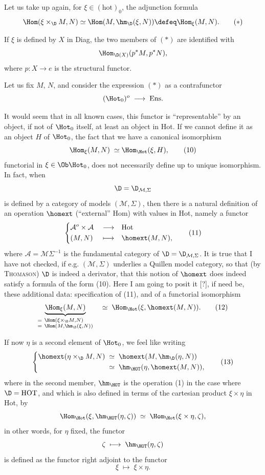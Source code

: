Let us take up again, for $\xi\in(\mathrm{hot})_0$, the adjunction formula
\[
\Hom(\xi\times_{\D}M,N)\simeq\Hom(M,\hm_{\D}(\xi,N))\defeq\Hom_{\xi}(M,N).
\tag*{$(*)$}
\]

If $\xi$ is defined by $X$ in Diag, the two members of $(*)$ are identified with
\[
\Hom_{\D(X)}(p^*M,p^*N),
\]
where $p:X\longrightarrow e$ is the structural functor.

Let us fix $M$, $N$, and consider the expression $(*)$ as a contrafunctor
\[
(\Hot_0)^o\;\longrightarrow\;\mathrm{Ens}.
\]

It would seem that in all known cases, this functor is ``representable'' by an object, if not of $\Hot_0$ itself, at least an object in Hot. If we cannot define it as an object $H$ of $\Hot_0$, the fact that we have a canonical isomorphism
\[
\Hom_{\xi}(M,N)\;\simeq\Hom_{\Hot}(\xi,H),
\tag*{(10)}
\]
functorial in $\xi\in\Ob\Hot_0$, does not necessarily define 
up to unique isomorphism. In fact, when
\[
\D=\D_{\mathcal{M},\Sigma}
\]
is defined by a category of models $(\mathcal{M},\Sigma)$, then there is a natural definition of an operation $\homext$ (``external'' Hom) with values in Hot, namely a functor
\[
\left\{
\begin{aligned}
&\mathcal{A}^o\times\mathcal{A} &&\longrightarrow &&\mathrm{Hot}\\
&(M,N) &&\longmapsto &&\homext(M,N),
\end{aligned}
\right.
\tag*{(11)}
\]
where $\mathcal{A}=\mathcal{M}\Sigma^{-1}$ is the fundamental category of $\D=\D_{\mathcal{M},\Sigma}$. It is true that I have not checked, if e.g. $(\mathcal{M},\Sigma)$ underlies a Quillen model category, so that (by \textsc{Thomason}) $\D$ is indeed a derivator, that this notion of $\homext$ does indeed satisfy a formula of the form (10). Here I am going to posit it [?], if need be, these additional data: specification of (11), and of a functorial isomorphism
\[
\underbrace{\Hom_{\xi}(M,N)}_{\begin{subarray}{l}=\ \Hom(\xi\times_{\D}M,N)\\ =\ \Hom(M,\hm_{\D}(\xi,N))\end{subarray}}
\quad\simeq\;\Hom_{\Hot}(\xi,\homext(M,N)).
\tag*{(12)}
\]

If now $\eta$ is a second element of $\Hot_0$, we feel like writing
\[
\left\{
\begin{aligned}
\homext(\eta\times_{\D}M,N) &\;\simeq\;\homext(M,\hm_{\D}(\eta,N))\\
&\;\simeq\;\hm_{\HOT}(\eta,\homext(M,N)),
\end{aligned}
\right.
\tag*{(13)}
\]
where in the second member, $\hm_{\HOT}$ is the operation (1) in the case where $\D=\mathrm{HOT}$, and which is also defined in terms of the cartesian product $\xi\times\eta$ in Hot, by
\[
\Hom_{\Hot}(\xi,\hm_{\HOT}(\eta,\zeta))\;\simeq\;\Hom_{\Hot}(\xi\times\eta,\zeta),
\]
in other words, for $\eta$ fixed, the functor
\[
\zeta\;\longmapsto\;\hm_{\HOT}(\eta,\zeta)
\]
is defined as the functor right adjoint to the functor
\[
\xi\;\longmapsto\;\xi\times\eta.
\]

